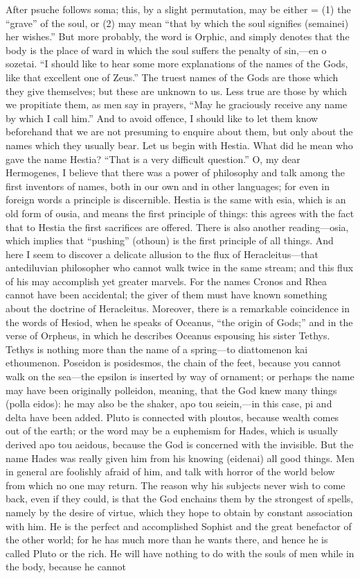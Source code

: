 \documentclass[11pt,letter]{article}
\begin{document}
\par  After psuche follows soma; this, by a slight permutation, may be either = (1) the “grave” of the soul, or (2) may mean “that by which the soul signifies (semainei) her wishes.” But more probably, the word is Orphic, and simply denotes that the body is the place of ward in which the soul suffers the penalty of sin,—en o sozetai. “I should like to hear some more explanations of the names of the Gods, like that excellent one of Zeus.” The truest names of the Gods are those which they give themselves; but these are unknown to us. Less true are those by which we propitiate them, as men say in prayers, “May he graciously receive any name by which I call him.” And to avoid offence, I should like to let them know beforehand that we are not presuming to enquire about them, but only about the names which they usually bear. Let us begin with Hestia. What did he mean who gave the name Hestia? “That is a very difficult question.” O, my dear Hermogenes, I believe that there was a power of philosophy and talk among the first inventors of names, both in our own and in other languages; for even in foreign words a principle is discernible. Hestia is the same with esia, which is an old form of ousia, and means the first principle of things: this agrees with the fact that to Hestia the first sacrifices are offered. There is also another reading—osia, which implies that “pushing” (othoun) is the first principle of all things. And here I seem to discover a delicate allusion to the flux of Heracleitus—that antediluvian philosopher who cannot walk twice in the same stream; and this flux of his may accomplish yet greater marvels. For the names Cronos and Rhea cannot have been accidental; the giver of them must have known something about the doctrine of Heracleitus. Moreover, there is a remarkable coincidence in the words of Hesiod, when he speaks of Oceanus, “the origin of Gods;” and in the verse of Orpheus, in which he describes Oceanus espousing his sister Tethys. Tethys is nothing more than the name of a spring—to diattomenon kai ethoumenon. Poseidon is posidesmos, the chain of the feet, because you cannot walk on the sea—the epsilon is inserted by way of ornament; or perhaps the name may have been originally polleidon, meaning, that the God knew many things (polla eidos): he may also be the shaker, apo tou seiein,—in this case, pi and delta have been added. Pluto is connected with ploutos, because wealth comes out of the earth; or the word may be a euphemism for Hades, which is usually derived apo tou aeidous, because the God is concerned with the invisible. But the name Hades was really given him from his knowing (eidenai) all good things. Men in general are foolishly afraid of him, and talk with horror of the world below from which no one may return. The reason why his subjects never wish to come back, even if they could, is that the God enchains them by the strongest of spells, namely by the desire of virtue, which they hope to obtain by constant association with him. He is the perfect and accomplished Sophist and the great benefactor of the other world; for he has much more than he wants there, and hence he is called Pluto or the rich. He will have nothing to do with the souls of men while in the body, because he cannot 
\end{document}
